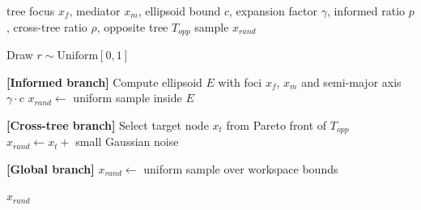 \documentclass[11pt]{article}
\begin{document}
\begin{algorithm}
\caption{ADCS: Adaptive Dual-Ellipsoid Constrained Sampling}
\begin{algorithmic}[1]
\Require tree focus $x_f$, mediator $x_m$, ellipsoid bound $c$,
         expansion factor $\gamma$, informed ratio $p$,
         cross-tree ratio $\rho$, opposite tree $T_{opp}$
\Ensure  sample $x_{rand}$

\State Draw $r \sim \text{Uniform}[0, 1]$

  \State \textbf{[Informed branch]}
  \State Compute ellipsoid $E$ with foci $x_f$, $x_m$ and semi-major axis $\gamma \cdot c$
  \State $x_{rand} \leftarrow$ uniform sample inside $E$

  \State \textbf{[Cross-tree branch]}
  \State Select target node $x_t$ from Pareto front of $T_{opp}$
  \State $x_{rand} \leftarrow x_t +$ small Gaussian noise

\Else
  \State \textbf{[Global branch]}
  \State $x_{rand} \leftarrow$ uniform sample over workspace bounds
\EndIf

\Return $x_{rand}$
\end{algorithmic}
\end{algorithm}
\end{document}

